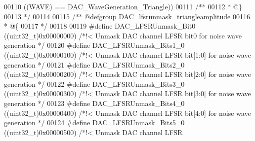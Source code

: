 \begin{DoxyCode}
00110                                     \textcolor{preprocessor}{(}\textcolor{preprocessor}{(}\textcolor{preprocessor}{WAVE}\textcolor{preprocessor}{)} \textcolor{preprocessor}{==} DAC_WaveGeneration_Triangle\textcolor{preprocessor}{)}\textcolor{preprocessor}{)}
00111 \textcolor{comment}{/**}
00112 \textcolor{comment}{  * @\}}
00113 \textcolor{comment}{  */}
00114 
00115 \textcolor{comment}{/** @defgroup DAC\_lfsrunmask\_triangleamplitude}
00116 \textcolor{comment}{  * @\{}
00117 \textcolor{comment}{  */}
00118 
00119 \textcolor{preprocessor}{#}\textcolor{preprocessor}{define} \textcolor{preprocessor}{DAC\_LFSRUnmask\_Bit0}                \textcolor{preprocessor}{(}\textcolor{preprocessor}{(}\textcolor{preprocessor}{uint32\_t}\textcolor{preprocessor}{)}0x00000000\textcolor{preprocessor}{)} \textcolor{comment}{/*!< Unmask DAC channel LFSR bit0
       for noise wave generation */}
00120 \textcolor{preprocessor}{#}\textcolor{preprocessor}{define} \textcolor{preprocessor}{DAC\_LFSRUnmask\_Bits1\_0}             \textcolor{preprocessor}{(}\textcolor{preprocessor}{(}\textcolor{preprocessor}{uint32\_t}\textcolor{preprocessor}{)}0x00000100\textcolor{preprocessor}{)} \textcolor{comment}{/*!< Unmask DAC channel LFSR
       bit[1:0] for noise wave generation */}
00121 \textcolor{preprocessor}{#}\textcolor{preprocessor}{define} \textcolor{preprocessor}{DAC\_LFSRUnmask\_Bits2\_0}             \textcolor{preprocessor}{(}\textcolor{preprocessor}{(}\textcolor{preprocessor}{uint32\_t}\textcolor{preprocessor}{)}0x00000200\textcolor{preprocessor}{)} \textcolor{comment}{/*!< Unmask DAC channel LFSR
       bit[2:0] for noise wave generation */}
00122 \textcolor{preprocessor}{#}\textcolor{preprocessor}{define} \textcolor{preprocessor}{DAC\_LFSRUnmask\_Bits3\_0}             \textcolor{preprocessor}{(}\textcolor{preprocessor}{(}\textcolor{preprocessor}{uint32\_t}\textcolor{preprocessor}{)}0x00000300\textcolor{preprocessor}{)} \textcolor{comment}{/*!< Unmask DAC channel LFSR
       bit[3:0] for noise wave generation */}
00123 \textcolor{preprocessor}{#}\textcolor{preprocessor}{define} \textcolor{preprocessor}{DAC\_LFSRUnmask\_Bits4\_0}             \textcolor{preprocessor}{(}\textcolor{preprocessor}{(}\textcolor{preprocessor}{uint32\_t}\textcolor{preprocessor}{)}0x00000400\textcolor{preprocessor}{)} \textcolor{comment}{/*!< Unmask DAC channel LFSR
       bit[4:0] for noise wave generation */}
00124 \textcolor{preprocessor}{#}\textcolor{preprocessor}{define} \textcolor{preprocessor}{DAC\_LFSRUnmask\_Bits5\_0}             \textcolor{preprocessor}{(}\textcolor{preprocessor}{(}\textcolor{preprocessor}{uint32\_t}\textcolor{preprocessor}{)}0x00000500\textcolor{preprocessor}{)} \textcolor{comment}{/*!< Unmask DAC channel LFSR
}
\end{DoxyCode}
